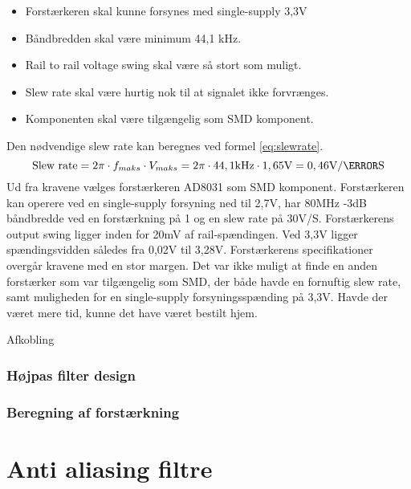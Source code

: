 \begin{itemize}
	\item Forstærkeren skal kunne forsynes med  single-supply 3,3V
	\item Båndbredden skal være minimum 44,1 kHz.
	\item Rail to rail voltage swing skal være så stort som muligt. 
	\item Slew rate skal være hurtig nok til at signalet ikke forvrænges. 
	\item Komponenten skal være tilgængelig som SMD komponent. 
\end{itemize}
Den nødvendige slew rate kan beregnes ved formel \ref{eq:slewrate}.\cite{slewrate}
\begin{equation}
\label{eq:slewrate}
\text{Slew rate} = 2 \pi \cdot f_{maks} \cdot V_{maks} = 2\pi \cdot 44,1\text{kHz} \cdot 1,65\text{V} = 0,46\text{V/\micro S}
\end{equation}
Ud fra kravene vælges forstærkeren AD8031 som SMD komponent. 
Forstærkeren kan operere ved en single-supply forsyning ned til 2,7V, har 80MHz -3dB båndbredde ved en forstærkning på 1 og en slew rate på 30V/\micro S. 
Forstærkerens output swing ligger inden for 20mV af rail-spændingen. Ved 3,3V ligger spændingsvidden således fra 0,02V til 3,28V. 
Forstærkerens specifikationer overgår kravene med en stor margen. 
Det var ikke muligt at finde en anden forstærker som var tilgængelig som SMD, der både havde en fornuftig slew rate, samt muligheden for en single-supply forsyningsspænding på 3,3V. 
Havde der været mere tid, kunne det have været bestilt hjem. 

Afkobling

\subsubsection{Højpas filter design}

\subsubsection{Beregning af forstærkning}


\section{Anti aliasing filtre}